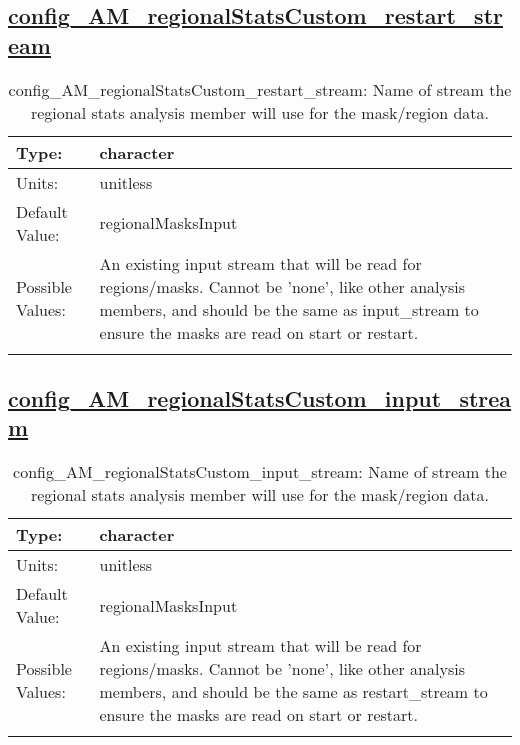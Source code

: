 \subsection[config\_AM\_regionalStatsCustom\_restart\_stream]{\hyperref[sec:nm_tab_AM_regionalStatsCustom]{config\_AM\_regionalStatsCustom\_restart\_stream}}
\label{subsec:nm_sec_config_AM_regionalStatsCustom_restart_stream}
\begin{center}
\begin{longtable}{| p{2.0in} || p{4.0in} |}
    \hline
    Type: & character \\
    \hline
    Units: & \si{unitless} \\
    \hline
    Default Value: & regionalMasksInput \\
    \hline
    Possible Values: & An existing input stream that will be read for regions/masks. Cannot be 'none', like other analysis members, and should be the same as input\_stream to ensure the masks are read on start or restart. \\
    \hline
    \caption{config\_AM\_regionalStatsCustom\_restart\_stream: Name of stream the regional stats analysis member will use for the mask/region data.}
\end{longtable}
\end{center}
\subsection[config\_AM\_regionalStatsCustom\_input\_stream]{\hyperref[sec:nm_tab_AM_regionalStatsCustom]{config\_AM\_regionalStatsCustom\_input\_stream}}
\label{subsec:nm_sec_config_AM_regionalStatsCustom_input_stream}
\begin{center}
\begin{longtable}{| p{2.0in} || p{4.0in} |}
    \hline
    Type: & character \\
    \hline
    Units: & \si{unitless} \\
    \hline
    Default Value: & regionalMasksInput \\
    \hline
    Possible Values: & An existing input stream that will be read for regions/masks. Cannot be 'none', like other analysis members, and should be the same as restart\_stream to ensure the masks are read on start or restart. \\
    \hline
    \caption{config\_AM\_regionalStatsCustom\_input\_stream: Name of stream the regional stats analysis member will use for the mask/region data.}
\end{longtable}
\end{center}
